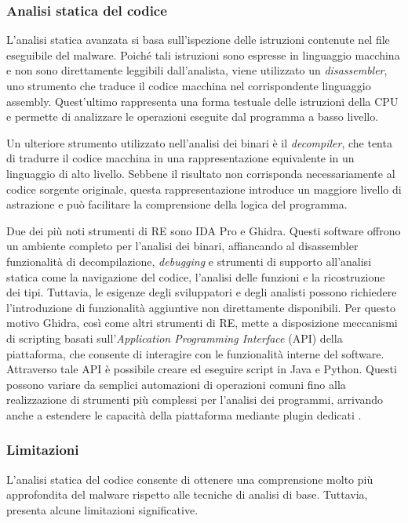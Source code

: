 \subsubsection{Analisi statica del codice}

L'analisi statica avanzata si basa sull'ispezione delle istruzioni contenute nel file eseguibile del malware. Poiché tali istruzioni sono espresse in linguaggio macchina e non sono direttamente leggibili dall'analista, viene utilizzato un \textit{disassembler}, uno strumento che traduce il codice macchina nel corrispondente linguaggio assembly. Quest'ultimo rappresenta una forma testuale delle istruzioni della CPU e permette di analizzare le operazioni eseguite dal programma a basso livello.

Un ulteriore strumento utilizzato nell'analisi dei binari è il \textit{decompiler}, che tenta di tradurre il codice macchina in una rappresentazione equivalente in un linguaggio di alto livello. Sebbene il risultato non corrisponda necessariamente al codice sorgente originale, questa rappresentazione introduce un maggiore livello di astrazione e può facilitare la comprensione della logica del programma.

Due dei più noti strumenti di RE sono IDA Pro e Ghidra. Questi software offrono un ambiente completo per l'analisi dei binari, affiancando al disassembler funzionalità di decompilazione, \textit{debugging} e strumenti di supporto all'analisi statica come la navigazione del codice, l'analisi delle funzioni e la ricostruzione dei tipi. Tuttavia, le esigenze degli sviluppatori e degli analisti possono richiedere l'introduzione di funzionalità aggiuntive non direttamente disponibili. Per questo motivo Ghidra, così come altri strumenti di RE, mette a disposizione meccanismi di scripting basati sull'\textit{Application Programming Interface} (API) della piattaforma, che consente di interagire con le funzionalità interne del software. Attraverso tale API è possibile creare ed eseguire script in Java e Python. Questi possono variare da semplici automazioni di operazioni comuni fino alla realizzazione di strumenti più complessi per l'analisi dei programmi, arrivando anche a estendere le capacità della piattaforma mediante plugin dedicati \cite{nance2026ghidra}.

\subsubsection{Limitazioni}

L'analisi statica del codice consente di ottenere una comprensione molto più approfondita del malware rispetto alle tecniche di analisi di base. Tuttavia, presenta alcune limitazioni significative.


